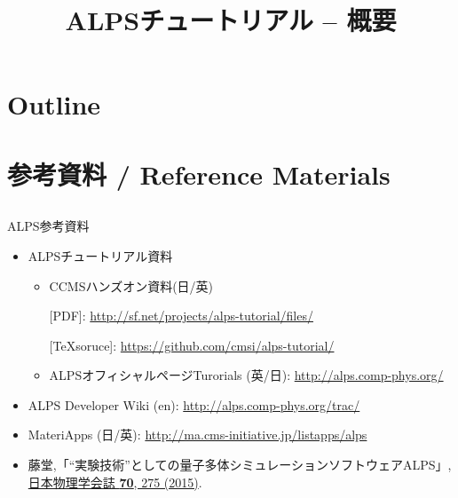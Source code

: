 
\title{ALPSチュートリアル -- 概要}




\begin{frame}
  \titlepage
\end{frame}

\section*{Outline}
\begin{frame}[t,fragile]
  \tableofcontents
\end{frame}

\section{参考資料 / Reference Materials}
\subsection*{\redb\whiteb\greenb}

\begin{frame}[t,fragile]{ALPS参考資料}
  \begin{itemize}
    \setlength{\itemsep}{1em}
  \item ALPSチュートリアル資料
    \begin{itemize}
    \item CCMSハンズオン資料(日/英)
      
      [PDF]: {\footnotesize \url{http://sf.net/projects/alps-tutorial/files/}}
      
      [\TeX soruce]: {\footnotesize \url{https://github.com/cmsi/alps-tutorial/}}
      
     \item ALPSオフィシャルページTurorials (英/日): {\footnotesize \url{http://alps.comp-phys.org/}}
    \end{itemize}
  \item ALPS Developer Wiki (en): {\footnotesize \url{http://alps.comp-phys.org/trac/}}
  \item MateriApps (日/英): {\footnotesize \url{http://ma.cms-initiative.jp/listapps/alps}}
  \item 藤堂,「``実験技術''としての量子多体シミュレーションソフトウェアALPS」, \href{http://www.jps.or.jp/books/gakkaishi/2015/04/06/70-04exp.pdf}{日本物理学会誌 {\bf 70}, 275 (2015)}.
  \end{itemize}
\end{frame}


